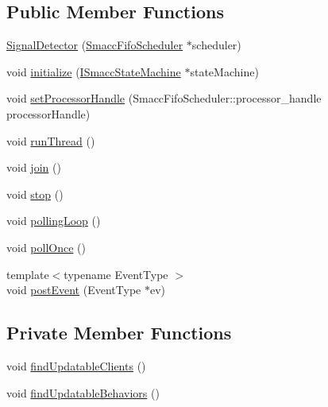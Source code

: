 \subsection*{Public Member Functions}
\begin{DoxyCompactItemize}
\item 
\hyperlink{classsmacc_1_1SignalDetector_a24914014feb0ab01e2452af705ef2774}{Signal\+Detector} (\hyperlink{smacc__fifo__scheduler_8h_a0063e275231c80d5f97df21d17257bf7}{Smacc\+Fifo\+Scheduler} $\ast$scheduler)
\item 
void \hyperlink{classsmacc_1_1SignalDetector_a91ab3cd92d8095cdaf8610b50731f04b}{initialize} (\hyperlink{classsmacc_1_1ISmaccStateMachine}{I\+Smacc\+State\+Machine} $\ast$state\+Machine)
\item 
void \hyperlink{classsmacc_1_1SignalDetector_ac1197a77c32a3b817005391e550ce646}{set\+Processor\+Handle} (Smacc\+Fifo\+Scheduler\+::processor\+\_\+handle processor\+Handle)
\item 
void \hyperlink{classsmacc_1_1SignalDetector_a48b3fee853ddcb25732408b22ecfcf39}{run\+Thread} ()
\item 
void \hyperlink{classsmacc_1_1SignalDetector_a636f704e469bf74b4a9fdb15bd63d5be}{join} ()
\item 
void \hyperlink{classsmacc_1_1SignalDetector_a536ea005ea4ef4632c0c9c1c62c557a3}{stop} ()
\item 
void \hyperlink{classsmacc_1_1SignalDetector_a2665e66cdae9f6533c64bbcecf3fa199}{polling\+Loop} ()
\item 
void \hyperlink{classsmacc_1_1SignalDetector_a9a116479e23259f3a5d5d4a47278afd5}{poll\+Once} ()
\item 
{\footnotesize template$<$typename Event\+Type $>$ }\\void \hyperlink{classsmacc_1_1SignalDetector_a6ab99d99cef8d101e39797a72daeb2b7}{post\+Event} (Event\+Type $\ast$ev)
\end{DoxyCompactItemize}
\subsection*{Private Member Functions}
\begin{DoxyCompactItemize}
\item 
void \hyperlink{classsmacc_1_1SignalDetector_a47ec2df560e2e33758ce3975bece9385}{find\+Updatable\+Clients} ()
\item 
void \hyperlink{classsmacc_1_1SignalDetector_a7e1301b9d23a522f18385368421c83f5}{find\+Updatable\+Behaviors} ()
\end{DoxyCompactItemize}
